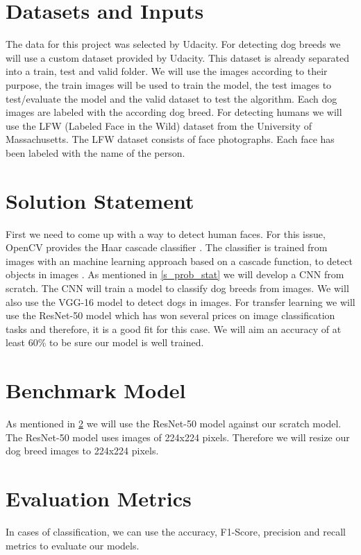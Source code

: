 \documentclass{article}
\begin{document}
 
\section{Datasets and Inputs} \label{s_data}
The data for this project was selected by Udacity. For detecting dog breeds we will use a custom dataset provided by Udacity. This dataset is already separated into a train, test and valid folder. We will use the images according to their purpose, the train images will be used to train the model, the test images to test/evaluate the model and the valid dataset to test the algorithm. Each dog images are labeled with the according dog breed.\newline
For detecting humans we will use the LFW (Labeled Face in the Wild) \cite{lfw} dataset from the University of Massachusetts. The LFW dataset consists of face photographs. Each face has been labeled with the name of the person.


\section{Solution Statement} \label{s_solution}
First we need to come up with a way to detect human faces. For this issue, OpenCV provides the Haar cascade classifier \cite{haar_cascade}. The classifier is trained from images with an machine learning approach based on a cascade function, to detect objects in images \cite{opencv}.\newline
As mentioned in \ref{s_prob_stat} we will develop a CNN from scratch. The CNN will train a model to classify dog breeds from images. We will also use the VGG-16 model to detect dogs in images. For transfer learning we will use the ResNet-50 model which has won several prices on image classification tasks and therefore, it is a good fit for this case. We will aim an accuracy of at least 60\% to be sure our model is well trained.


\section{Benchmark Model} \label{s_bench}
As mentioned in \ref{s_solution} we will use the ResNet-50 model against our scratch model. The ResNet-50 model uses images of 224x224 pixels. Therefore we will resize our dog breed images to 224x224 pixels.


\section{Evaluation Metrics} \label{s_eval}
In cases of classification, we can use the accuracy, F1-Score, precision and recall metrics to evaluate our models.\newline
\end{document}
